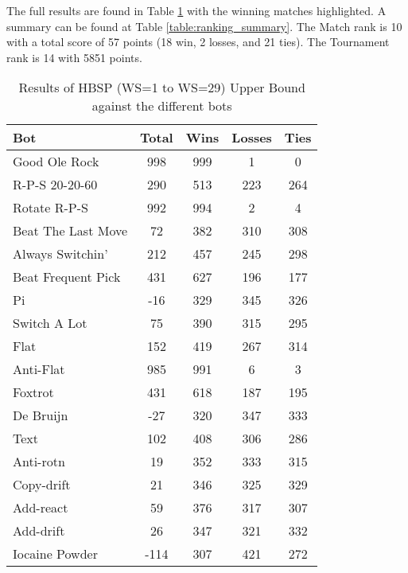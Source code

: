 The full results are found in Table \ref{table:JustPP_UpperBound_results} with the winning matches highlighted. A summary can be found at Table \ref{table:ranking_summary}. The Match rank is 10 with a total score of 57 points (18 win, 2 losses, and 21 ties). The Tournament rank is 14 with 5851 points.

\begin{table}
    \caption{Results of HBSP (WS=1 to WS=29) Upper Bound against the different bots}
    \label{table:JustPP_UpperBound_results}
    \centering
    \begin{tabular}{|l|c|c|c|c|}
        \hline
        \textbf{Bot} & \textbf{Total} & \textbf{Wins} & \textbf{Losses} & \textbf{Ties} \\ \hline
\rowcolor{HighlightRowColor} Good Ole Rock & 998 & 999 & 1 & 0 \\ \hline 
\rowcolor{HighlightRowColor} R-P-S 20-20-60 & 290 & 513 & 223 & 264 \\ \hline 
\rowcolor{HighlightRowColor} Rotate R-P-S & 992 & 994 & 2 & 4 \\ \hline 
\rowcolor{HighlightRowColor} Beat The Last Move & 72 & 382 & 310 & 308 \\ \hline 
\rowcolor{HighlightRowColor} Always Switchin' & 212 & 457 & 245 & 298 \\ \hline 
\rowcolor{HighlightRowColor} Beat Frequent Pick & 431 & 627 & 196 & 177 \\ \hline 
Pi & -16 & 329 & 345 & 326 \\ \hline 
\rowcolor{HighlightRowColor} Switch A Lot & 75 & 390 & 315 & 295 \\ \hline 
\rowcolor{HighlightRowColor} Flat & 152 & 419 & 267 & 314 \\ \hline 
\rowcolor{HighlightRowColor} Anti-Flat & 985 & 991 & 6 & 3 \\ \hline 
\rowcolor{HighlightRowColor} Foxtrot & 431 & 618 & 187 & 195 \\ \hline 
De Bruijn & -27 & 320 & 347 & 333 \\ \hline 
\rowcolor{HighlightRowColor} Text & 102 & 408 & 306 & 286 \\ \hline 
Anti-rotn & 19 & 352 & 333 & 315 \\ \hline 
Copy-drift & 21 & 346 & 325 & 329 \\ \hline 
\rowcolor{HighlightRowColor} Add-react & 59 & 376 & 317 & 307 \\ \hline 
Add-drift & 26 & 347 & 321 & 332 \\ \hline 
Iocaine Powder & -114 & 307 & 421 & 272 \\ \hline 

\end{tabular}
\end{table}
